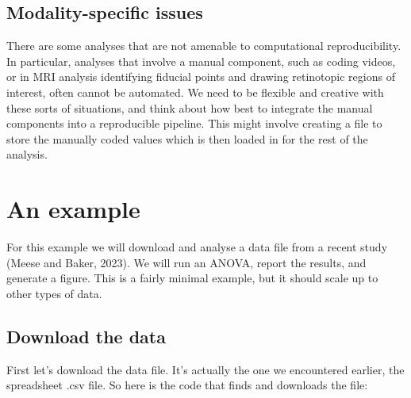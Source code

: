 \documentclass[
]{article}
\begin{document}
\hypertarget{modality-specific-issues}{%
\subsection{Modality-specific issues}\label{modality-specific-issues}}

There are some analyses that are not amenable to computational reproducibility. In particular, analyses that involve a manual component, such as coding videos, or in MRI analysis identifying fiducial points and drawing retinotopic regions of interest, often cannot be automated. We need to be flexible and creative with these sorts of situations, and think about how best to integrate the manual components into a reproducible pipeline. This might involve creating a file to store the manually coded values which is then loaded in for the rest of the analysis.

\hypertarget{an-example}{%
\section{An example}\label{an-example}}

For this example we will download and analyse a data file from a recent study (Meese and Baker, 2023). We will run an ANOVA, report the results, and generate a figure. This is a fairly minimal example, but it should scale up to other types of data.

\hypertarget{download-the-data}{%
\subsection{Download the data}\label{download-the-data}}

First let's download the data file. It's actually the one we encountered earlier, the spreadsheet .csv file. So here is the code that finds and downloads the file:
\end{document}

